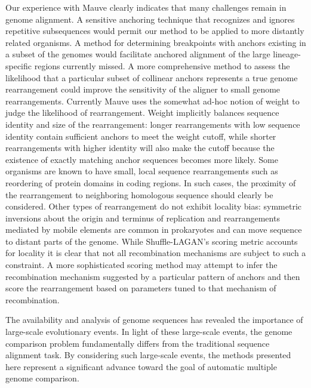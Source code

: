 \documentclass[titlepage,11pt]{article}
\begin{document}
Our experience with Mauve clearly indicates that many challenges remain in
genome alignment.  A sensitive anchoring technique that recognizes and ignores
repetitive subsequences would permit our method to be applied to more distantly
related organisms.  A method for determining breakpoints with anchors existing
in a subset of the genomes would facilitate anchored alignment of the large
lineage-specific regions currently missed.  A more comprehensive method to
assess the likelihood that a particular subset of collinear anchors represents
a true genome rearrangement could improve the sensitivity of the aligner to
small genome rearrangements.  Currently Mauve uses the somewhat ad-hoc notion
of weight to judge the likelihood of rearrangement.  Weight implicitly balances
sequence identity and size of the rearrangement:  longer rearrangements with
low sequence identity contain sufficient anchors to meet the weight cutoff,
while shorter rearrangements with higher identity will also make the cutoff
because the existence of exactly matching anchor sequences becomes more likely.
Some organisms are known to have small, local sequence rearrangements such as
reordering of protein domains in coding regions.  In such cases, the proximity
of the rearrangement to neighboring homologous sequence should clearly be
considered.   Other types of rearrangement do not exhibit locality bias:
symmetric inversions about the origin and terminus of replication and
rearrangements mediated by mobile elements are common in prokaryotes and can
move sequence to distant parts of the genome. While Shuffle-LAGAN's scoring
metric accounts for locality it is clear that not all recombination mechanisms
are subject to such a constraint. A more sophisticated scoring method may
attempt to infer the recombination mechanism suggested by a particular pattern
of anchors and then score the rearrangement based on parameters tuned to that
mechanism of recombination.

The availability and analysis of genome sequences has revealed the importance
of large-scale evolutionary events.  In light of these large-scale events, the
genome comparison problem fundamentally differs from the traditional sequence
alignment task.  By considering such large-scale events, the methods presented
here represent a significant advance toward the goal of automatic multiple genome
comparison.

\end{document}
